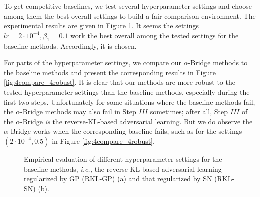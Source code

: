 \documentclass[letterpaper]{article} %
\newcommand{\ie}[0]{\emph{i.e., }}
\begin{document}
To get competitive baselines, we test several hyperparameter settings and choose among them the best overall settings to build a fair comparison environment. The experimental results are given in Figure \ref{fig:base_hypara}. 
It seems the settings $lr=2\cdot10^{-4}, \beta_1=0.1$ work the best overall among the tested settings for the baseline methods. Accordingly, it is chosen. 


For parts of the hyperparameter settings, we compare our $\alpha$-Bridge methods to the baseline methods and present the corresponding results in Figure \ref{fig:4compare_4robust}. It is clear that our methods are more robust to the tested hyperparameter settings than the baseline methods, especially during the first two steps. Unfortunately for some situations where the baseline methods fail, the $\alpha$-Bridge methods may also fail in Step $I\!I\!I$ sometimes; after all, Step $I\!I\!I$ of the $\alpha$-Bridge \emph{is} the reverse-KL-based adversarial learning. But we do observe the $\alpha$-Bridge works when the corresponding baseline fails, such as for the settings $(2\cdot10^{-4}, 0.5)$ in Figure \ref{fig:4compare_4robust}.


\begin{figure}[H]
	\begin{center}
		\caption{\small Empirical evaluation of different hyperparameter settings for the baseline methods, \ie the reverse-KL-based adversarial learning regularized by GP (RKL-GP) (a) and that regularized by SN (RKL-SN) (b).
		}
		\label{fig:base_hypara}
	\end{center}
\end{figure}
\end{document}
